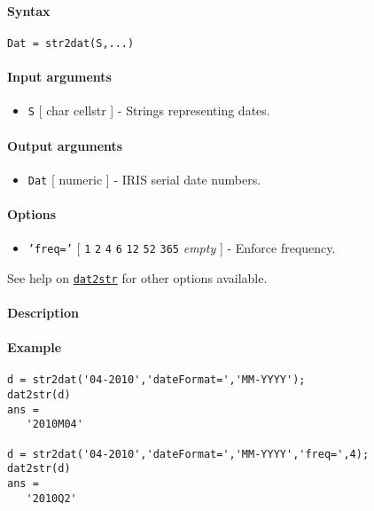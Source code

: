 


	\paragraph{Syntax}\label{syntax}

\begin{verbatim}
Dat = str2dat(S,...)
\end{verbatim}

\paragraph{Input arguments}\label{input-arguments}

\begin{itemize}
\itemsep1pt\parskip0pt
\item
  \texttt{S} {[} char \textbar{} cellstr {]} - Strings representing
  dates.
\end{itemize}

\paragraph{Output arguments}\label{output-arguments}

\begin{itemize}
\itemsep1pt\parskip0pt
\item
  \texttt{Dat} {[} numeric {]} - IRIS serial date numbers.
\end{itemize}

\paragraph{Options}\label{options}

\begin{itemize}
\itemsep1pt\parskip0pt
\item
  \texttt{'freq='} {[} \texttt{1} \textbar{} \texttt{2} \textbar{}
  \texttt{4} \textbar{} \texttt{6} \textbar{} \texttt{12} \textbar{}
  \texttt{52} \textbar{} \texttt{365} \textbar{} \emph{empty} {]} -
  Enforce frequency.
\end{itemize}

See help on \href{dates/dat2str}{\texttt{dat2str}} for other options
available.

\paragraph{Description}\label{description}

\paragraph{Example}\label{example}

\begin{verbatim}
d = str2dat('04-2010','dateFormat=','MM-YYYY');
dat2str(d)
ans =
   '2010M04'

d = str2dat('04-2010','dateFormat=','MM-YYYY','freq=',4);
dat2str(d)
ans =
   '2010Q2'
\end{verbatim}


